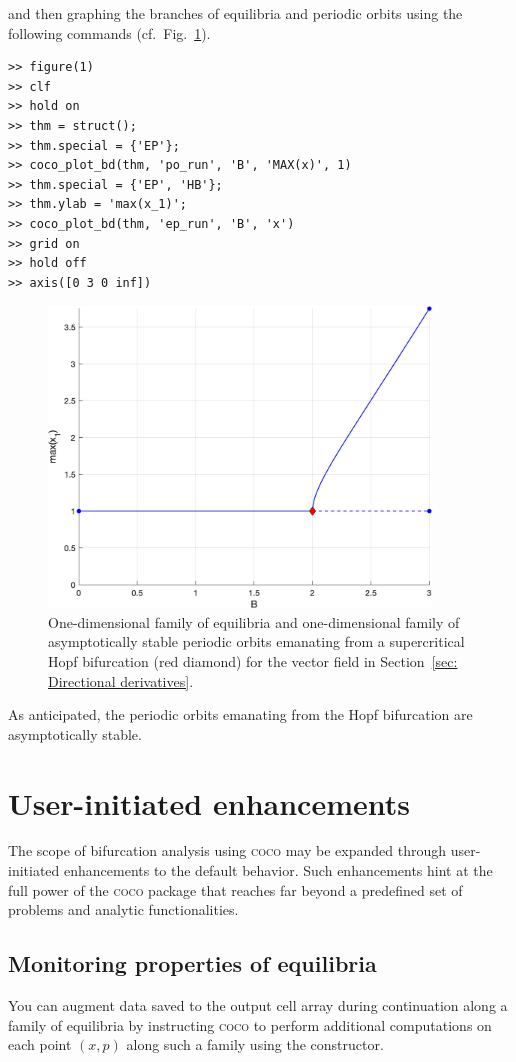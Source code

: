 and then graphing the branches of equilibria and periodic orbits using the following commands (cf.\ Fig.~\ref{fig: Section6_3_1}).
\begin{lstlisting}[language=coco-highlight,frame=lines]
>> figure(1)
>> clf
>> hold on
>> thm = struct();
>> thm.special = {'EP'};
>> coco_plot_bd(thm, 'po_run', 'B', 'MAX(x)', 1)
>> thm.special = {'EP', 'HB'};
>> thm.ylab = 'max(x_1)';
>> coco_plot_bd(thm, 'ep_run', 'B', 'x')
>> grid on
>> hold off
>> axis([0 3 0 inf])
\end{lstlisting}
\begin{figure}[h]
\centering
\includegraphics[width=4in]{Figures/Section6_3_1.jpg}
\caption{One-dimensional family of equilibria and one-dimensional family of asymptotically stable periodic orbits emanating from a supercritical Hopf bifurcation (red diamond) for the vector field in Section~\ref{sec: Directional derivatives}.}
\label{fig: Section6_3_1}
\end{figure}
As anticipated, the periodic orbits emanating from the Hopf bifurcation are asymptotically stable.

\section{User-initiated enhancements}
The scope of bifurcation analysis using \textsc{coco} may be expanded through user-initiated enhancements to the default behavior. Such enhancements hint at the full power of the \textsc{coco} package that reaches far beyond a predefined set of problems and analytic functionalities.

\subsection{Monitoring properties of equilibria}
\label{sec: Monitoring properties of equilibria}
You can augment data saved to the output cell array during continuation along a family of equilibria by instructing \textsc{coco} to perform additional computations on each point $(x,p)$ along such a family using the  constructor.

